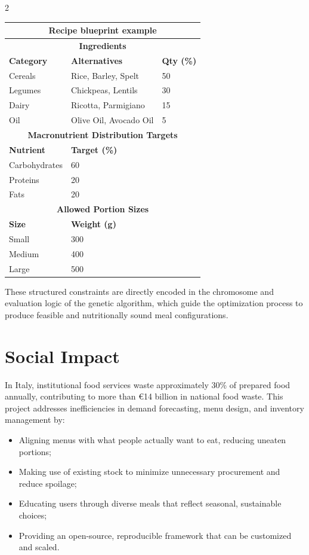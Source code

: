 \documentclass[10pt,a4paper]{article}
\begin{document}
\begin{multicols}{2}
\begin{center}
\begin{tabular}{@{} l l l @{} }
\toprule
\multicolumn{3}{c}{\textbf{Recipe blueprint example}} \\
\toprule
\multicolumn{3}{c}{\textbf{Ingredients}} \\
\midrule
\textbf{Category} & \textbf{Alternatives} & \textbf{Qty (\%)} \\
\midrule
Cereals & Rice, Barley, Spelt & 50 \\
Legumes & Chickpeas, Lentils & 30 \\
Dairy & Ricotta, Parmigiano & 15 \\
Oil & Olive Oil, Avocado Oil & 5 \\
\midrule
\multicolumn{3}{c}{\textbf{Macronutrient Distribution Targets}} \\
\midrule
\textbf{Nutrient} & \textbf{Target (\%)} & \\
Carbohydrates & 60 & \\
Proteins & 20 & \\
Fats & 20 & \\
\midrule
\multicolumn{3}{c}{\textbf{Allowed Portion Sizes}} \\
\midrule
\textbf{Size} & \textbf{Weight (g)} & \\
Small & 300 & \\
Medium & 400 & \\
Large & 500 & \\
\bottomrule
\end{tabular}
\end{center}

These structured constraints are directly encoded in the chromosome and evaluation logic of the genetic algorithm, which guide the optimization process to produce feasible and nutritionally sound meal configurations.

\section{Social Impact}

In Italy, institutional food services waste approximately 30\% of prepared food annually, contributing to more than \euro14 billion in national food waste. This project addresses inefficiencies in demand forecasting, menu design, and inventory management by:

\begin{itemize}[leftmargin=*]
  \item Aligning menus with what people actually want to eat, reducing uneaten portions;
  \item Making use of existing stock to minimize unnecessary procurement and reduce spoilage;
  \item Educating users through diverse meals that reflect seasonal, sustainable choices;
  \item Providing an open-source, reproducible framework that can be customized and scaled.
\end{itemize}


\end{multicols}
\end{document}
